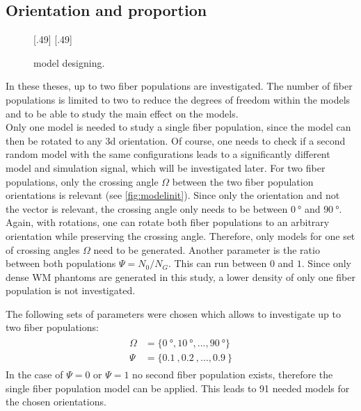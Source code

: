 \subsection{Orientation and proportion}\label{sec:modelParamet}
% 
\begin{figure}[t]
\centering
\def\tikzwidth{0.42*\textwidth}
[.49\textwidth]{\hfill{}\hfill}\hfill
{}
[.49\textwidth]{\hfill{}\hfill}
\\
\caption{model designing.}
\label{fig:twomodelpopdesign}
\end{figure}
% 
In these theses, up to two fiber populations are investigated.
The number of fiber populations is limited to two to reduce the degrees of freedom within the models and to be able to study the main effect on the models.
\\
% 
Only one model is needed to study a single fiber population, since the model can then be rotated to any 3d orientation.
Of course, one needs to check if a second random model with the same configurations leads to a significantly different model and simulation signal, which will be investigated later.
For two fiber populations, only the crossing angle $\Omega$ between the two fiber population orientations is relevant (see \cref{fig:modelinit}).
Since only the orientation and not the vector is relevant, the crossing angle only needs to be between $\SI{0}{\degree}$ and $\SI{90}{\degree}$.
Again, with rotations, one can rotate both fiber populations to an arbitrary orientation while preserving the crossing angle.
Therefore, only models for one set of crossing angles $\Omega$ need to be generated.
Another parameter is the ratio between both populations $\Psi=N_0/N_G$.
This can run between $0$ and $1$.
Since only dense \ac{WM} phantoms are generated in this study, a lower density of only one fiber population is not investigated.
\par
% 
The following sets of parameters were chosen which allows to investigate up to two fiber populations:
\begin{align}
    \begin{split}
        \Omega &= \{\SI{0}{\degree}, \SI{10}{\degree}, ..., \SI{90}{\degree}\}\\
        \Psi &= \{\SI{0.1}{}, \SI{0.2}{}, ..., \SI{0.9}{}\}
    \end{split}
\end{align}
In the case of $\Psi = 0$ or $\Psi = 1$ no second fiber population exists, therefore the single fiber population model can be applied.
This leads to 91 needed models for the chosen orientations.
% 
